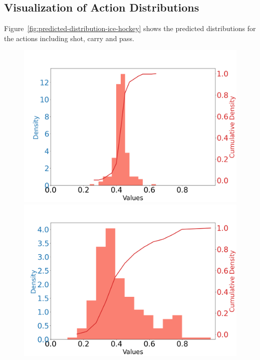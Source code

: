 \documentclass{article}
\begin{document}
\subsection{Visualization of Action Distributions}
Figure~\ref{fig:predicted-distribution-ice-hockey} shows the predicted distributions for the actions including shot, carry and pass.
\begin{figure}[htbp]
    \begin{minipage}{0.195\textwidth}
    \centering
    \includegraphics[scale=0.08]{figures/shot_density_idx_0_XCoord:9.24_YCoord:19.87.png}
    \end{minipage}
    \begin{minipage}{0.195\textwidth}
    \centering
    \includegraphics[scale=0.08]{figures/shot_density_idx_16_XCoord:79.27_YCoord:5.78.png}

\end{minipage}
\end{figure}
\end{document}
